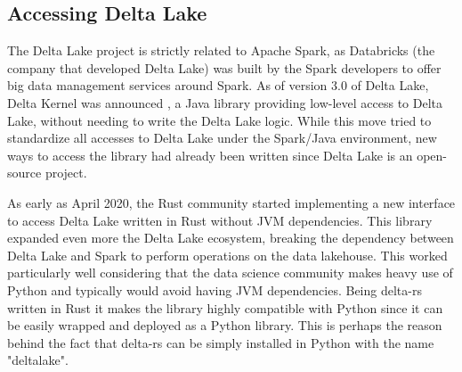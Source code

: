 \subsection{Accessing Delta Lake}
\label{subsec:delta_lake_access}

The Delta Lake project is strictly related to Apache Spark, as Databricks (the company that developed Delta Lake) was built by the Spark developers \cite{zaharia2010spark} to offer big data management services around Spark. As of version 3.0 of Delta Lake, Delta Kernel was announced \cite{AnnouncingDeltaLake2023}, a Java library providing low-level access to Delta Lake, without needing to write the Delta Lake logic. While this move tried to standardize all accesses to Delta Lake under the Spark/Java environment, new ways to access the library had already been written since Delta Lake is an open-source project.

As early as April 2020, the Rust community started implementing a new interface to access Delta Lake written in Rust without \gls{JVM} dependencies. This library expanded even more the Delta Lake ecosystem, breaking the dependency between Delta Lake and Spark to perform operations on the data lakehouse. This worked particularly well considering that the data science community makes heavy use of Python and typically would avoid having \gls{JVM} dependencies. Being delta-rs written in Rust it makes the library highly compatible with Python since it can be easily wrapped and deployed as a Python library. This is perhaps the reason behind the fact that delta-rs can be simply installed in Python with the name "deltalake".